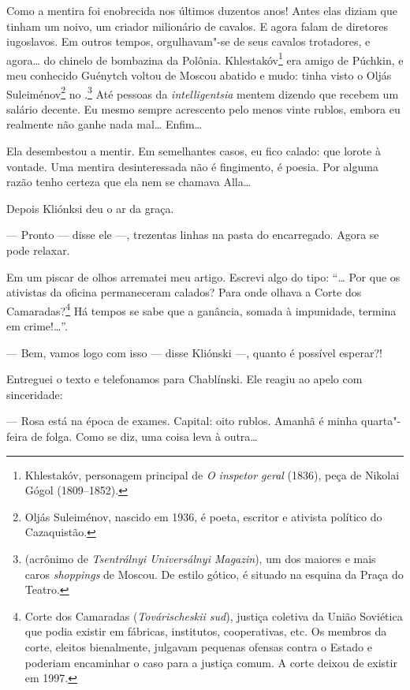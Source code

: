 Como a mentira foi enobrecida nos últimos duzentos anos! Antes elas
diziam que tinham um noivo, um criador milionário de cavalos. E agora
falam de diretores iugoslavos. Em outros tempos, orgulhavam"-se de seus
cavalos trotadores, e agora\ldots{} do chinelo de bombazina da Polônia.
Khlestakóv\footnote{Khlestakóv, personagem principal de \emph{O inspetor
  geral} (1836), peça de Nikolai Gógol (1809--1852).} era amigo
de Púchkin, e meu conhecido Guénytch voltou de Moscou abatido e mudo:
tinha visto o Oljás Suleiménov\footnote{Oljás Suleiménov, nascido em
  1936, é poeta, escritor e ativista político do Cazaquistão.} no
.\footnote{ (acrônimo de \emph{Tsentrálnyi Universálnyi
  Magazin}), um dos maiores e mais caros \emph{shoppings} de Moscou. De
  estilo gótico, é situado na esquina da Praça do Teatro.} Até pessoas
da \emph{intelligentsia} mentem dizendo que recebem um salário decente.
Eu mesmo sempre acrescento pelo menos vinte rublos, embora eu realmente
não ganhe nada mal\ldots{} Enfim\ldots{}

Ela desembestou a mentir. Em semelhantes casos, eu fico calado: que
lorote à vontade. Uma mentira desinteressada não é fingimento, é poesia.
Por alguma razão tenho certeza que ela nem se chamava Alla\ldots{}

Depois Kliónksi deu o ar da graça.

--- Pronto --- disse ele ---, trezentas linhas na pasta do encarregado.
Agora se pode relaxar.

Em um piscar de olhos arrematei meu artigo. Escrevi algo do tipo: ``\ldots{}
Por que os ativistas da oficina permaneceram calados? Para onde olhava a
Corte dos Camaradas?\footnote{Corte dos Camaradas (\emph{Továrischeskii
sud}), justiça coletiva da União Soviética que podia existir em
  fábricas, institutos, cooperativas, etc. Os membros da corte, eleitos
  bienalmente, julgavam pequenas ofensas contra o Esta­do e poderiam
  encaminhar o caso para a justiça comum. A corte deixou de existir em
  1997.} Há tempos se sabe que a ganância, somada à impunidade, termina
em crime!\ldots{}''.

--- Bem, vamos logo com isso --- disse Kliónski ---, quanto é possível
esperar?!

Entreguei o texto e telefonamos para Chablínski. Ele reagiu ao apelo com
sinceridade:

--- Rosa está na época de exames. Capital: oito rublos. Amanhã é minha
quarta"-feira de folga. Como se diz, uma coisa leva à outra\ldots{}

